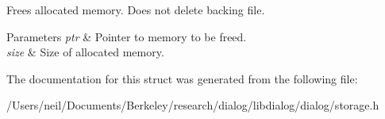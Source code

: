 Frees allocated memory. Does not delete backing file.


\begin{DoxyParams}{Parameters}
{\em ptr} & Pointer to memory to be freed. \\
\hline
{\em size} & Size of allocated memory. \\
\hline
\end{DoxyParams}


The documentation for this struct was generated from the following file\+:\begin{DoxyCompactItemize}
\item 
/\+Users/neil/\+Documents/\+Berkeley/research/dialog/libdialog/dialog/storage.\+h\end{DoxyCompactItemize}
